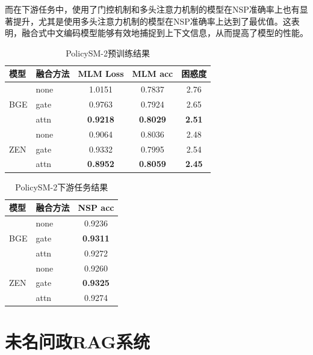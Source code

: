 \documentclass[12pt, a4paper]{ctexart}
\begin{document}
而在下游任务中，使用了门控机制和多头注意力机制的模型在NSP准确率上也有显著提升，尤其是使用多头注意力机制的模型在NSP准确率上达到了最优值。这表明，融合式中文编码模型能够有效地捕捉到上下文信息，从而提高了模型的性能。

\begin{table}[htbp]
    \centering
    \begin{tabular}{llccc}
      \toprule
      模型 & 融合方法 & MLM Loss & MLM acc & 困惑度 \\
      \midrule
      \multirow{3}{*}{BGE}
        & none & 1.0151 & 0.7837 & 2.76 \\
        & gate & 0.9763 & 0.7924 & 2.65 \\
        & attn & \textbf{0.9218} & \textbf{0.8029} & \textbf{2.51} \\
      \midrule
      \multirow{3}{*}{ZEN}
        & none & 0.9064 & 0.8036 & 2.48 \\
        & gate & 0.9332 & 0.7995 & 2.54 \\
        & attn & \textbf{0.8952} & \textbf{0.8059} & \textbf{2.45} \\
      \bottomrule
    \end{tabular}
    \caption{PolicySM-2预训练结果}
    \label{tab:pretrain-results}
  \end{table}
  
  \begin{table}[htbp]
    \centering
    \begin{tabular}{llc}
      \toprule
      模型 & 融合方法 & NSP acc \\
      \midrule
      \multirow{3}{*}{BGE}
        & none & 0.9236 \\
        & gate & \textbf{0.9311} \\
        & attn & 0.9272 \\
      \midrule
      \multirow{3}{*}{ZEN}
        & none & 0.9260 \\
        & gate & \textbf{0.9325} \\
        & attn & 0.9274 \\
      \bottomrule
    \end{tabular}
    \caption{PolicySM-2下游任务结果}
    \label{tab:nsp-results}
  \end{table}


\section{未名问政RAG系统}
  
\end{document}
